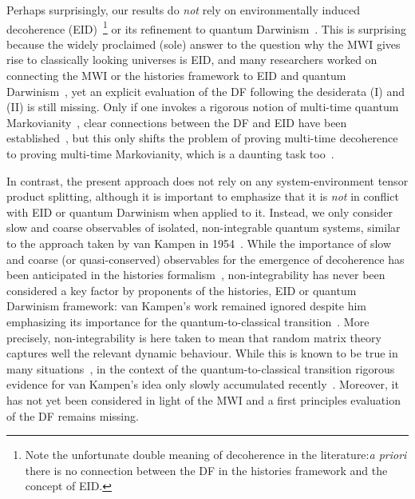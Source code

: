 \documentclass[pre,onecolumn,12pt,aps,longbibliography,nofootinbib]{revtex4-2}
\newcommand{\blue}[1]{#1}
\newcommand{\new}[1]{#1}
\begin{document}
Perhaps surprisingly, our results do \emph{not} rely on environmentally induced decoherence (EID)~\cite{ZurekRMP2003, JoosEtAlBook2003, SchlosshauerPR2019}\footnote{Note the unfortunate double meaning of decoherence in the literature:\emph{a priori} there is no connection between the DF in the histories framework and the concept of EID.} or its refinement to quantum Darwinism~\cite{ZurekNP2009, KorbiczQuantum2021, ZurekEnt2022}. This is surprising because the widely proclaimed (sole) answer to the question why the MWI gives rise to classically looking universes is EID, and many researchers worked on connecting the MWI or the histories framework to EID and quantum Darwinism~\cite{FinkelsteinPRD1993, SaundersFP1993, PazZurekPRD1993, DiosiEtAlPRL1995, BrunPRL1997, YuPA1998, VaidmanISPS1998, BrunPRA2000, RiedelZurekZwolakPRA2016, RiedelPRL2017,  AlbrechtBaunachArrasmithPRD2022, TouilEtAlArXiv2022, StrasbergSP2023}, yet an explicit evaluation of the DF following the desiderata (I) and (II) is still missing. Only if one invokes a rigorous notion of multi-time quantum Markovianity~\cite{PollockEtAlPRL2018, LiHallWisemanPR2018, MilzModiPRXQ2021}, clear connections between the DF and EID have been established~\cite{PazZurekPRD1993, DiosiEtAlPRL1995, BrunPRL1997, YuPA1998, BrunPRA2000, StrasbergSP2023}, but this only shifts the problem of proving multi-time \new{decoherence} to proving multi-time Markovianity, which is a daunting task too~\cite{DuemckeJMP1983, FordOConnellPRL1996, FigueroaRomeroModiPollockQuantum2019, FigueroaRomeroPollockModiCP2021, StrasbergEtAlPRA2023}.

In contrast, the present approach does not rely on any system-environment tensor product splitting, although it is important to emphasize that it is \emph{not} in conflict with EID or quantum Darwinism when applied to it. Instead, we only consider slow and coarse observables of isolated, non-integrable quantum systems, similar to the approach taken by van Kampen in 1954~\cite{VanKampenPhys1954}. While the importance of slow and coarse (or quasi-conserved) observables \new{for the emergence of decoherence} has been \new{anticipated in the histories formalism~\cite{GellMannHartlePRD1993, BrunHalliwellPRD1996, HalliwellPRD1998, HalliwellPRL1999, CalzettaHuPRD1999, HalliwellPRD2003, GellMannHartlePRA2007, HalliwellInBook2010}, non-integrability has never been considered} a key factor by proponents of the histories, EID or quantum Darwinism framework: van Kampen's work \new{remained} ignored despite him emphasizing its importance for the quantum-to-classical transition~\cite{VanKampenEtAlPT2000, VanKampenAJP2008}. \blue{More precisely, non-integrability is here taken to mean that random matrix theory captures well the relevant dynamic behaviour. While this is known to be true in many situations~\cite{Wigner1967, BrodyEtAlRMP1981, BeenakkerRMP1997, GuhrMuellerGroelingWeidenmuellerPR1998, HaakeBook2010, DAlessioEtAlAP2016, DeutschRPP2018}, in the context of the quantum-to-classical transition rigorous evidence for van Kampen's idea only slowly accumulated recently~\cite{GemmerSteinigewegPRE2014, SchmidtkeGemmerPRE2016, NationPorrasPRE2020, StrasbergEtAlPRA2023, StrasbergSP2023}. Moreover}, it has not yet been considered in light of the MWI and \new{a first principles evaluation of the DF remains missing.}
\end{document}
